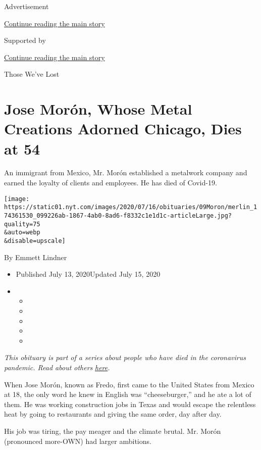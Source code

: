 Advertisement

\protect\hyperlink{after-top}{Continue reading the main story}

Supported by

\protect\hyperlink{after-sponsor}{Continue reading the main story}

Those We've Lost

\hypertarget{jose-moruxf3n-whose-metal-creations-adorned-chicago-dies-at-54}{%
\section{Jose Morón, Whose Metal Creations Adorned Chicago, Dies at
54}\label{jose-moruxf3n-whose-metal-creations-adorned-chicago-dies-at-54}}

An immigrant from Mexico, Mr. Morón established a metalwork company and
earned the loyalty of clients and employees. He has died of Covid-19.

\texttt{[image: https://static01.nyt.com/images/2020/07/16/obituaries/09Moron/merlin\_174361530\_099226ab-1867-4ab0-8ad6-f8332c1e1d1c-articleLarge.jpg?quality=75\\\&auto=webp\\\&disable=upscale]}

By Emmett Lindner

\begin{itemize}
\item
  Published July 13, 2020Updated July 15, 2020
\item
  \begin{itemize}
  \item
  \item
  \item
  \item
  \item
  \end{itemize}
\end{itemize}

\emph{This obituary is part of a series about people who have died in
the coronavirus pandemic. Read about others}
\href{https://www.nytimes.com/interactive/2020/obituaries/people-died-coronavirus-obituaries.html}{\emph{here}}\emph{.}

When Jose Morón, known as Fredo, first came to the United States from
Mexico at 18, the only word he knew in English was ``cheeseburger,'' and
he ate a lot of them. He was working construction jobs in Texas and
would escape the relentless heat by going to restaurants and giving the
same order, day after day.

His job was tiring, the pay meager and the climate brutal. Mr. Morón
(pronounced more-OWN) had larger ambitions.

